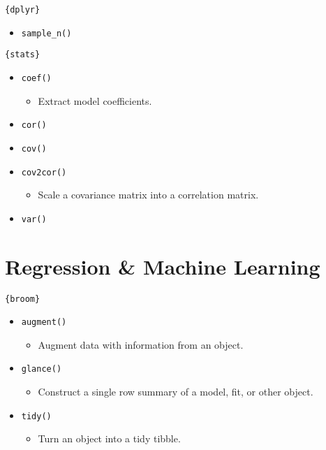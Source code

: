 \documentclass[
]{book}
\providecommand{\tightlist}{%
  \setlength{\itemsep}{0pt}\setlength{\parskip}{0pt}}
\begin{document}
\texttt{\{dplyr\}}

\begin{itemize}
\tightlist
\item
  \texttt{sample\_n()}
\end{itemize}

\texttt{\{stats\}}

\begin{itemize}
\tightlist
\item
  \texttt{coef()}

  \begin{itemize}
  \tightlist
  \item
    Extract model coefficients.
  \end{itemize}
\item
  \texttt{cor()}
\item
  \texttt{cov()}
\item
  \texttt{cov2cor()}

  \begin{itemize}
  \tightlist
  \item
    Scale a covariance matrix into a correlation matrix.
  \end{itemize}
\item
  \texttt{var()}
\end{itemize}

\hypertarget{regression-machine-learning}{%
\section{Regression \& Machine Learning}\label{regression-machine-learning}}

\texttt{\{broom\}}

\begin{itemize}
\tightlist
\item
  \texttt{augment()}

  \begin{itemize}
  \tightlist
  \item
    Augment data with information from an object.
  \end{itemize}
\item
  \texttt{glance()}

  \begin{itemize}
  \tightlist
  \item
    Construct a single row summary of a model, fit, or other object.
  \end{itemize}
\item
  \texttt{tidy()}

  \begin{itemize}
  \tightlist
  \item
    Turn an object into a tidy tibble.
  \end{itemize}
\end{itemize}
\end{document}
